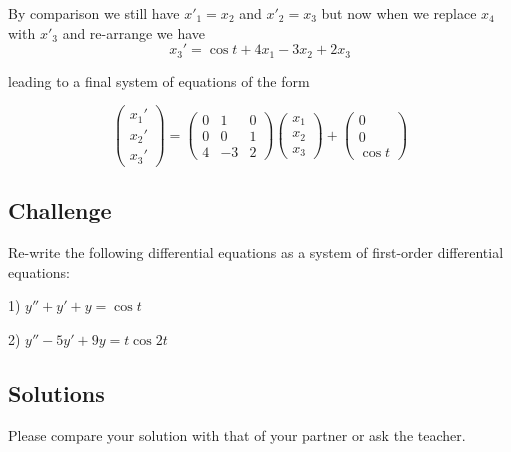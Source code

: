 By comparison we still have $x'_1 = x_2$ and $x'_2 = x_3$ but now when we replace $x_4$ with $x'_3$ and re-arrange we have
\begin{equation}
   x_3' = \cos t + 4 x_1 - 3 x_2 + 2 x_3
\end{equation}

leading to a final system of equations of the form

\begin{equation}
    \left(
        \begin{array}{c}
            x_1' \\
            x_2' \\
            x_3'
        \end{array}
    \right)
    =
    \left(
        \begin{array}{ccc}
            0 & 1 & 0 \\
            0 & 0 & 1 \\
            4 & -3 & 2
        \end{array}
    \right)
    \left(
        \begin{array}{c}
            x_1 \\
            x_2 \\
            x_3
        \end{array}
    \right)
    +
    \left(
        \begin{array}{c}
            0 \\
            0 \\
            \cos t
        \end{array}
    \right)
\end{equation}

\subsection*{Challenge}
Re-write the following differential equations as a system of first-order differential equations:

1) $y'' + y' + y = \cos t$

2) $y'' - 5 y' + 9 y = t \cos 2t$

\subsection*{Solutions}
Please compare your solution with that of your partner or ask the teacher.



\iffalse
\newpage
%
